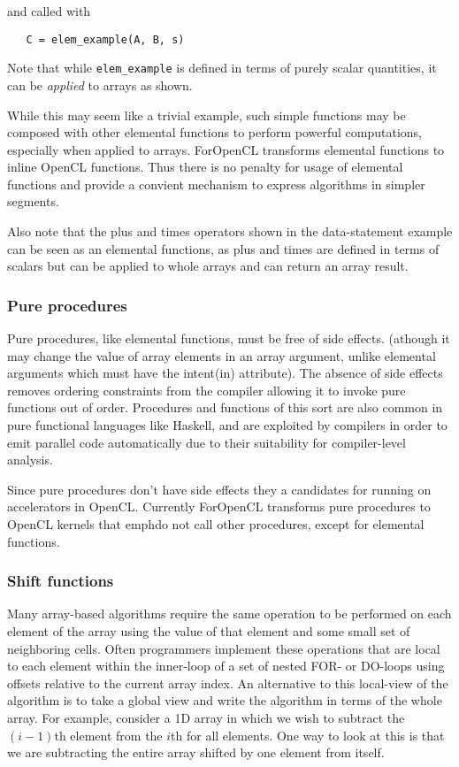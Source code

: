 and called with

\begin{verbatim}
   C = elem_example(A, B, s)
\end{verbatim}

Note that while {\tt elem\_example} is defined in terms of purely scalar
quantities, it can be \emph{applied} to arrays as shown.

While this may seem like a trivial example, such simple functions may be
composed with other elemental functions to perform powerful computations,
especially when applied to arrays.  ForOpenCL transforms elemental functions to inline OpenCL
functions.  Thus there is no penalty for usage of elemental functions and provide
a convient mechanism to express algorithms in simpler segments.

Also note that the plus and times operators shown in the data-statement
example can be seen as an elemental functions, as plus and times are defined
in terms of scalars but can be applied to whole arrays and can return an array
result.

\subsubsection*{Pure procedures}

Pure procedures, like elemental functions, must be free of side effects.
(athough it may change the value of array elements in an array argument,
unlike elemental arguments which must have the intent(in) attribute).
The absence of side effects removes ordering constraints from the compiler
allowing it to invoke pure functions out of order.  Procedures and functions
of this sort are also common in pure functional languages like Haskell,
and are exploited by compilers in order to emit parallel code automatically
due to their suitability for compiler-level analysis.

Since pure procedures don't have side effects they a candidates for running on
accelerators in OpenCL.  Currently ForOpenCL transforms pure procedures to
OpenCL kernels that emph{do not} call other procedures, except for elemental
functions.

\subsubsection*{Shift functions}

Many array-based algorithms require the same operation to be performed
on each element of the array using the value of that element and some small
set of neighboring cells.  Often programmers implement these operations that
are local to each element within the inner-loop of a set of nested FOR-
or DO-loops using offsets relative to the current array index.  An alternative
to this local-view of the algorithm is to take a global view and write the
algorithm in terms of the whole array.  For example, consider a 1D array in
which we wish to subtract the $(i-1)$th element from the $i$th for all
elements.  One way to look at this is that we are subtracting the entire array
shifted by one element from itself.

